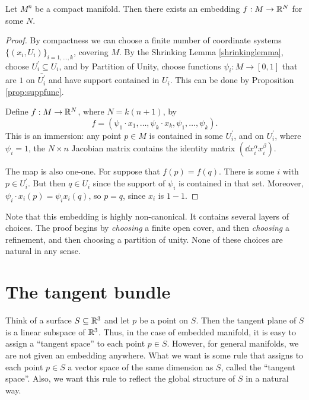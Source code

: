 \documentclass[11pt, english]{article}
\begin{document}
\begin{thm}
  Let $M^n$ be a compact manifold. Then there exists an embedding $f:M \to \mathbb{R}^N$ for some $N$.
\end{thm}
\begin{proof}
By compactness we can choose a finite number of coordinate systems $\{ (x_i,U_i) \}_{i=1,\ldots,k}$, covering $M$. By the Shrinking Lemma \ref{shrinkinglemma}, choose $U_i^\prime \subseteq U_i$, and by Partition of Unity, choose functions $\psi_i\colon M \to [0,1]$ that are $1$ on $\bar{U_i^\prime}$ and have support contained in $U_i$. This can be done by Proposition \ref{prop:suppfunc}.

Define $f:M \to \mathbb{R}^N$, where $N=k(n+1)$, by
\[
f = \left(\psi_1 \cdot x_1, \ldots, \psi_k \cdot x_k, \psi_1,\ldots, \psi_k\right).
\] 
This is an immersion: any point $p \in M$ is contained in some $U_i^\prime$, and on $U_i^\prime$, where $\psi_i=1$, the $N \times n$ Jacobian matrix contains the identity matrix $\left(\dd{x_i^\alpha}{x_i^\beta}\right)$.

The map is also one-one. For suppose that $f(p)=f(q)$. There is some $i$ with $p \in U_i^\prime$. But then $q \in U_i$ since the support of $\psi_i$ is contained in that set. Moreover, $\psi_i \cdot x_i(p)=\psi_i x_i(q)$, so $p=q$, since $x_i$ is $1-1$.
\end{proof}
\begin{remark}
Note that this embedding is highly non-canonical. It contains several layers of choices. The proof begins by \emph{choosing} a finite open cover, and then \emph{choosing} a refinement, and then choosing a partition of unity. None of these choices are natural in any sense.
\end{remark} 


\newpage
\section{The tangent bundle}

Think of a surface $S \subseteq \mathbb{R}^3$ and let $p$ be a point on $S$. Then the tangent plane of $S$ is a linear subspace of $\mathbb{R}^3$. Thus, in the case of embedded manifold, it is easy to assign a ``tangent space'' to each point $p \in S$. However, for general manifolds, we are not given an embedding anywhere. What we want is some rule that assigns to each point $p \in S$ a vector space of the same dimension as $S$, called the ``tangent space''. Also, we want this rule to reflect the global structure of $S$ in a natural way.
\end{document}

